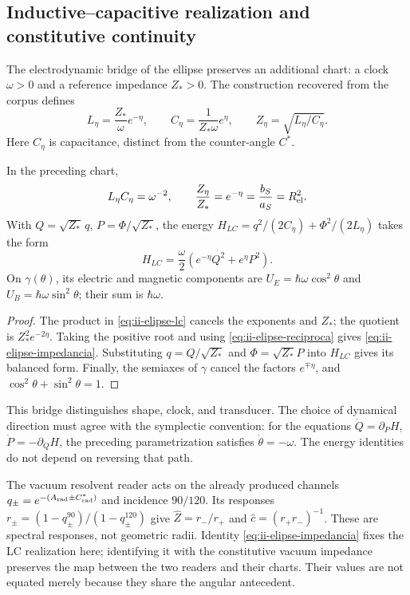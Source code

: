 \subsection{Inductive--capacitive realization and constitutive continuity}
\label{sec:ii-elipse-lc}

The electrodynamic bridge of the ellipse preserves an additional chart:
a clock \(\omega>0\) and a reference impedance \(Z_*>0\).
The construction recovered from the corpus defines
\begin{equation}
 L_\eta=\frac{Z_*}{\omega}e^{-\eta},\qquad
 C_\eta=\frac{1}{Z_*\omega}e^\eta,
 \qquad Z_\eta=\sqrt{L_\eta/C_\eta}.
 \label{eq:ii-elipse-lc}
\end{equation}
Here \(C_\eta\) is capacitance, distinct from the counter-angle \(C^*\).
\begin{proposition}
\label{prop:ii-elipse-lc}
In the preceding chart,
\begin{equation}
 L_\eta C_\eta=\omega^{-2},\qquad
 \frac{Z_\eta}{Z_*}=e^{-\eta}
 =\frac{b_S}{a_S}=R_{\rm el}^{2}.
 \label{eq:ii-elipse-impedancia}
\end{equation}
With \(Q=\sqrt{Z_*}\,q\), \(P=\Phi/\sqrt{Z_*}\), the energy
\(H_{LC}=q^2/(2C_\eta)+\Phi^2/(2L_\eta)\) takes the form
\[
 H_{LC}=\frac\omega2(e^{-\eta}Q^2+e^\eta P^2).
\]
On \(\gamma(\theta)\), its electric and magnetic components are
\(U_E=\hbar\omega\cos^2\theta\) and
\(U_B=\hbar\omega\sin^2\theta\); their sum is \(\hbar\omega\).
\end{proposition}
\begin{proof}
The product in \eqref{eq:ii-elipse-lc} cancels the exponents and
\(Z_*\); the quotient is \(Z_*^2e^{-2\eta}\). Taking the positive
root and using \eqref{eq:ii-elipse-reciproca} gives
\eqref{eq:ii-elipse-impedancia}. Substituting \(q=Q/\sqrt{Z_*}\)
and \(\Phi=\sqrt{Z_*}P\) into \(H_{LC}\) gives its balanced form.
Finally, the semiaxes of \(\gamma\) cancel the factors
\(e^{\mp\eta}\), and \(\cos^2\theta+\sin^2\theta=1\).
\end{proof}

This bridge distinguishes shape, clock, and transducer. The choice
of dynamical direction must agree with the symplectic convention: for
the equations \(\dot Q=\partial_PH\),
\(\dot P=-\partial_QH\), the preceding parametrization satisfies
\(\dot\theta=-\omega\). The energy identities do not depend
on reversing that path.

The vacuum resolvent reader acts on the already produced channels
\(q_\pm=e^{-(A_{\rm rad}\pm C^*_{\rm rad})}\) and incidence
\(90/120\). Its responses
\(r_\pm=(1-q_\pm^{90})/(1-q_\pm^{120})\) give
\(\widehat Z=r_-/r_+\) and \(\widehat c=(r_+r_-)^{-1}\).
These are spectral responses, not geometric radii. Identity
\eqref{eq:ii-elipse-impedancia} fixes the LC realization here;
identifying it with the constitutive vacuum impedance preserves the map
between the two readers and their charts. Their values are not equated merely because
they share the angular antecedent.
